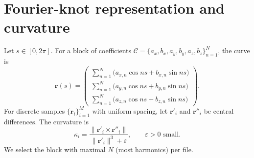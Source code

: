 \documentclass[11pt]{article}
\begin{document}
    \section*{Fourier-knot representation and curvature}

    Let $s\in[0,2\pi]$. For a block of coefficients
    $\mathcal{C}=\{a_x,b_x,a_y,b_y,a_z,b_z\}_{n=1}^{N}$, the curve is
    \[
        \mathbf{r}(s)=
        \begin{pmatrix}
            \sum_{n=1}^{N}\big(a_{x,n}\cos ns + b_{x,n}\sin ns\big)\\
            \sum_{n=1}^{N}\big(a_{y,n}\cos ns + b_{y,n}\sin ns\big)\\
            \sum_{n=1}^{N}\big(a_{z,n}\cos ns + b_{z,n}\sin ns\big)
        \end{pmatrix}.
    \]
    For discrete samples $\{\mathbf{r}_i\}_{i=1}^{M}$ with uniform spacing,
    let $\mathbf{r}'_i$ and $\mathbf{r}''_i$ be central differences. The curvature is
    \[
        \kappa_i=\frac{\|\mathbf{r}'_i\times \mathbf{r}''_i\|}
        {\|\mathbf{r}'_i\|^{3}+\varepsilon},\qquad \varepsilon>0 \text{ small}.
    \]
    We select the block with maximal $N$ (most harmonics) per file.
\end{document}

